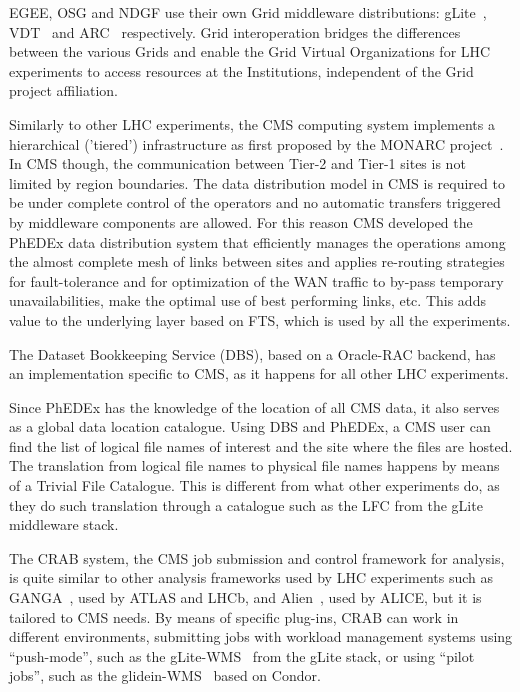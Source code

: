 EGEE, OSG and NDGF use their own Grid middleware distributions: gLite~\cite{RefgLite}, VDT~\cite{RefVDT} and ARC~\cite{RefARC} respectively. Grid interoperation bridges the differences between the various Grids and enable the Grid Virtual Organizations for LHC experiments to access resources at the Institutions, independent of the Grid project affiliation.

Similarly to other LHC experiments, the CMS computing system 
implements a hierarchical ('tiered') infrastructure as first proposed by the MONARC project~\cite{RefMONARC}. 
In CMS though, the communication between Tier-2 and Tier-1 sites is not limited by region boundaries. The data distribution model in CMS is required to be
under complete control of the operators and no automatic transfers triggered
by middleware components are allowed. For this reason CMS developed the
PhEDEx data distribution system that efficiently manages the operations 
among the almost complete mesh of links between sites and 
applies re-routing strategies for fault-tolerance and %
for optimization of
the WAN traffic to by-pass temporary unavailabilities, make the optimal use of best performing links, etc.
This adds
value to the underlying layer based on FTS, which is used by all the
experiments.

The Dataset Bookkeeping Service (DBS), based on a Oracle-RAC backend, has an 
implementation specific to CMS, as it happens for all other LHC experiments.


Since PhEDEx has the knowledge of the location of all CMS data, it also
serves as a global data location catalogue. Using DBS and PhEDEx, a CMS user
can find the list of logical file names of interest and the site where the
files are hosted. 
The translation from logical file names to physical file names happens 
by means of a Trivial File Catalogue.
This is different from what other experiments do, as they do such translation through
 a catalogue such as the LFC from the gLite middleware stack.

The CRAB system, the CMS job submission and control framework for analysis, is quite
similar to other analysis frameworks used by LHC experiments such as GANGA~\cite{RefGANGA}, used by ATLAS and LHCb, and Alien~\cite{RefAlien}, used by ALICE, 
but it is tailored to CMS needs. By means of specific plug-ins, CRAB can work in
different environments, submitting jobs with workload management systems
using ``push-mode'', such as the gLite-WMS~\cite{RefgLiteWMS} from the gLite 
stack, or using ``pilot jobs'', such as the glidein-WMS~\cite{Refglidein} based on Condor.



